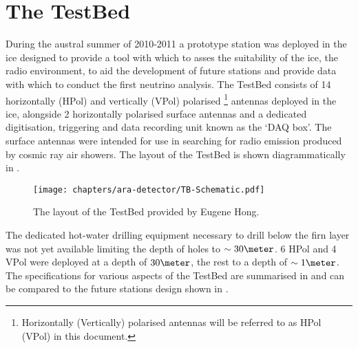 \section{The TestBed}
\label{sec:ara-detector:TestBed}

During the austral summer of 2010-2011 a prototype station was deployed in the ice designed to provide a tool with which to asses the suitability of the ice, the radio environment, to aid the development of future stations and provide data with which to conduct the first neutrino analysis. The TestBed consists of 14 horizontally (HPol) and vertically (VPol) polarised \footnote{Horizontally (Vertically) polarised antennas will be referred to as HPol (VPol) in this document.} antennas deployed in the ice, alongside 2 horizontally polarised surface antennas and a dedicated digitisation, triggering and data recording unit known as the `DAQ box'. The surface antennas were intended for use in searching for radio emission produced by cosmic ray air showers. The layout of the TestBed is shown diagrammatically in .

\begin{figure}[htpb]
  \centering
  \texttt{[image: chapters/ara-detector/TB-Schematic.pdf]}
  \caption{The layout of the TestBed provided by Eugene Hong.}
  \label{fig:ara-detector:TestBed:Schematic}
\end{figure}

The dedicated hot-water drilling equipment necessary to drill below the firn layer was not yet available limiting the depth of holes to $\sim 30 \meter$. 6 HPol and 4 VPol were deployed at a depth of $30 \meter$, the rest to a depth of $\sim 1 \meter$. The specifications for various aspects of the TestBed are summarised in  and can be compared to the future stations design shown in .


